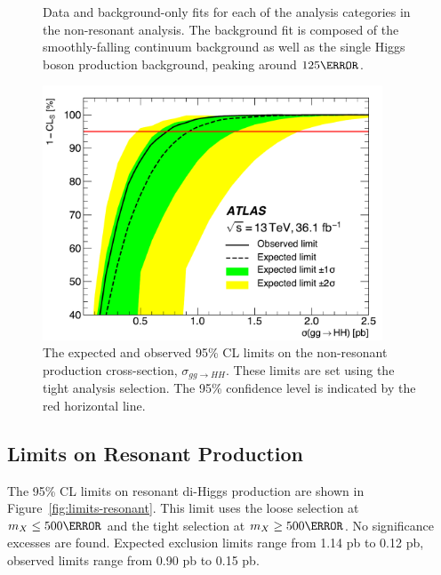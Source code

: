 \begin{figure}[!htbp]
	\caption{Data and background-only fits for each of the analysis categories in the non-resonant analysis. The background fit is composed of the smoothly-falling continuum \yy background as well as the single Higgs boson production background, peaking around $\unit{125}{\GeV}$.}
  \label{fig:results-myy}
\end{figure}


\begin{figure}[!htbp]
  \centering
\includegraphics[width=0.9\textwidth]{chapters/chapter5_yybb/images/limits/nonresonant.pdf}
  \caption[The expected and observed limits on the non-resonant \HH production cross-section]
  {The expected and observed 95\% \gls{CL} limits on the non-resonant \hh production cross-section, $\sigma_{gg\rightarrow HH}$. These limits are set using the tight analysis selection. The 95\% confidence level is indicated by the red horizontal line.}
  \label{fig:limits-nonresonant}
\end{figure}

\subsection{Limits on Resonant Production}

The 95\% \gls{CL} limits on resonant di-Higgs production are shown in Figure~\ref{fig:limits-resonant}. This limit uses the loose selection at $m_{X} \leq \unit{500}{\GeV}$ and the tight selection at $m_{X} \geq \unit{500}{\GeV}$. No significance excesses are found. Expected exclusion limits range from 1.14 pb to 0.12 pb, observed limits range from 0.90 pb to 0.15 pb.

